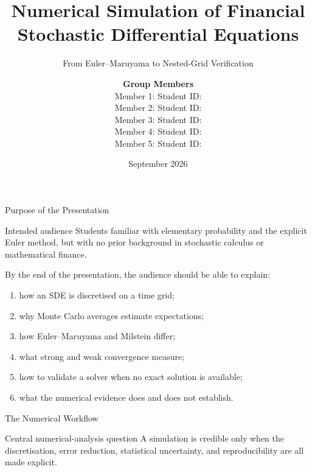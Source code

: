 \documentclass[aspectratio=169,10pt]{beamer}
\title[Financial SDEs: Numerical Simulation]{Numerical Simulation of Financial Stochastic Differential Equations}
\subtitle{From Euler--Maruyama to Nested-Grid Verification}
\author[Group Presentation]{%
  \begin{tabular}{c}
    \textbf{Group Members}\\[0.25em]
    Member 1: \underline{\hspace{2.7cm}}\quad Student ID: \underline{\hspace{2.3cm}}\\[0.12em]
    Member 2: \underline{\hspace{2.7cm}}\quad Student ID: \underline{\hspace{2.3cm}}\\[0.12em]
    Member 3: \underline{\hspace{2.7cm}}\quad Student ID: \underline{\hspace{2.3cm}}\\[0.12em]
    Member 4: \underline{\hspace{2.7cm}}\quad Student ID: \underline{\hspace{2.3cm}}\\[0.12em]
    Member 5: \underline{\hspace{2.7cm}}\quad Student ID: \underline{\hspace{2.3cm}}
  \end{tabular}%
}
\institute{Numerical Partial Differential Equations}
\date{September 2026}
\newcommand{\dd}{\,\mathrm{d}}
\begin{document}
\begin{frame}
  \titlepage
\end{frame}

\begin{frame}{Purpose of the Presentation}
  \begin{block}{Intended audience}
    Students familiar with elementary probability and the explicit Euler method,
    but with no prior background in stochastic calculus or mathematical finance.
  \end{block}
  By the end of the presentation, the audience should be able to explain:
  \begin{enumerate}
    \item how an SDE is discretised on a time grid;
    \item why Monte Carlo averages estimate expectations;
    \item how Euler--Maruyama and Milstein differ;
    \item what strong and weak convergence measure;
    \item how to validate a solver when no exact solution is available;
    \item what the numerical evidence does and does not establish.
  \end{enumerate}
\end{frame}

\begin{frame}{The Numerical Workflow}
  \centering
  \vspace{1em}
  \begin{alertblock}{Central numerical-analysis question}
    A simulation is credible only when the discretisation, error reduction,
    statistical uncertainty, and reproducibility are all made explicit.
  \end{alertblock}
\end{frame}
\end{document}
